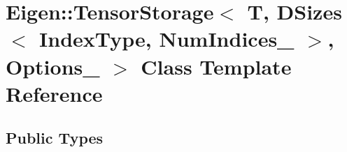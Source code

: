 \hypertarget{class_eigen_1_1_tensor_storage_3_01_t_00_01_d_sizes_3_01_index_type_00_01_num_indices___01_4_00_01_options___01_4}{}\section{Eigen\+:\+:Tensor\+Storage$<$ T, D\+Sizes$<$ Index\+Type, Num\+Indices\+\_\+ $>$, Options\+\_\+ $>$ Class Template Reference}
\label{class_eigen_1_1_tensor_storage_3_01_t_00_01_d_sizes_3_01_index_type_00_01_num_indices___01_4_00_01_options___01_4}
\subsection*{Public Types}
